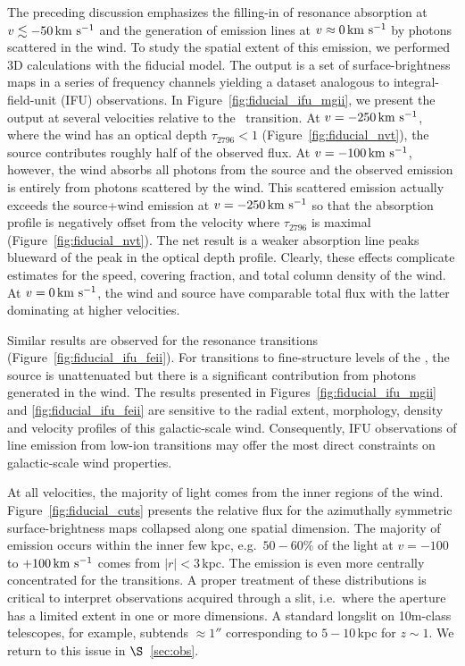 \documentclass[12pt,preprint]{aastex}
\begin{document}
The preceding discussion emphasizes the filling-in of resonance absorption at $v
\lesssim -50 \, {\rm km~s^{-1}}$ and the generation of emission lines at $v \approx
0 \, {\rm km~s^{-1}}$ by photons scattered in the wind.  To study the spatial
extent of this emission, we performed 3D calculations with the fiducial
model.  The output is a set of surface-brightness maps in a series of
frequency channels yielding a
dataset analogous to integral-field-unit (IFU) observations.  In
Figure~\ref{fig:fiducial_ifu_mgii}, we present the output 
at several velocities relative to the \mgiia\
transition. At $v = -250 \, {\rm km~s^{-1}}$, where the wind has an optical
depth $\tau_{2796} < 1$ (Figure~\ref{fig:fiducial_nvt}),
the source contributes roughly half of the observed flux.  
At $v=-100 \, {\rm km~s^{-1}}$, however, the
wind absorbs all photons from the source and the observed emission is
entirely from photons scattered by the wind.  This scattered emission
actually exceeds the source+wind emission at 
$v = -250 \, {\rm km~s^{-1}}$ so that the absorption profile is
negatively offset from the velocity where $\tau_{2796}$ is maximal
(Figure~\ref{fig:fiducial_nvt}).
The net result is
a weaker  absorption line peaks blueward of the peak in the
optical depth profile.  Clearly, these effects complicate estimates for the
speed, covering fraction, and total column density of the wind.  At $v
= 0 \, {\rm km~s^{-1}}$, the wind and source have comparable total flux with the
latter dominating at higher velocities.  

Similar results are observed for the  resonance
transitions (Figure~\ref{fig:fiducial_ifu_feii}).
For transitions to fine-structure levels of the \aconfig, the source
is unattenuated but there is a significant contribution from photons
generated in the wind. 
The results presented in Figures~\ref{fig:fiducial_ifu_mgii} and
\ref{fig:fiducial_ifu_feii} are sensitive to the radial extent,
morphology, density and velocity profiles of this galactic-scale
wind.  Consequently, IFU observations of line emission from low-ion
transitions may offer the most direct constraints on galactic-scale
wind properties. 

At all velocities, the majority of light comes from the inner regions
of the wind. 
Figure~\ref{fig:fiducial_cuts} presents the relative flux for the 
azimuthally symmetric surface-brightness maps collapsed along
one spatial dimension.  The majority of
 emission occurs within the inner few kpc, e.g.\ $50-60\%$
of the light at $v=-100$ to $+100 \, {\rm km~s^{-1}}$
comes from $|r| < 3$\,kpc.
The emission
is even more centrally concentrated for the  transitions.
A proper treatment of these
distributions is critical to interpret observations
acquired through a slit, i.e.\ where the aperture has a limited extent
in one or more dimensions.  A standard longslit on 10m-class
telescopes, for example, subtends $\approx 1''$ corresponding to
$5-10$\,kpc for $z \sim 1$.    We return to this issue in
$\S$~\ref{sec:obs}. 
\end{document}

